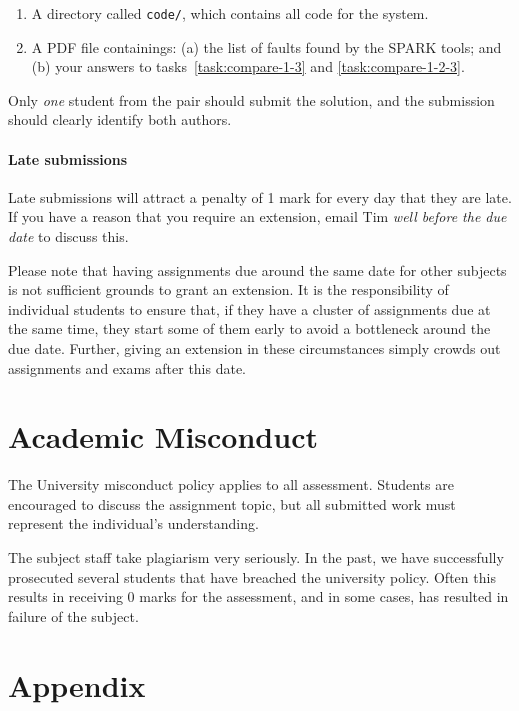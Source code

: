 \documentclass[a4paper,11pt]{article}
\begin{document}
\begin{enumerate}[topsep=0mm,itemsep=1mm]

 \item A directory called \texttt{code/}, which contains all code for the system.

 \item A PDF file containings: (a) the list of faults found by the SPARK tools; and (b) your answers to tasks~\ref{task:compare-1-3} and \ref{task:compare-1-2-3}.

\end{enumerate}

Only \emph{one} student from the pair should submit the solution, and the submission should clearly identify both authors.

\paragraph{Late submissions} Late submissions will attract a penalty of 1 mark for every day that they are late. If you have a reason that you require an extension, email Tim {\em well before the due date} to discuss this. 

Please note that having assignments due around the same date for other subjects is not sufficient grounds to grant an extension. It is the responsibility of individual students to ensure that, if they have a cluster of assignments due at the same time, they start some of them early to avoid a bottleneck around the due date. Further, giving an extension in these circumstances simply crowds out assignments and exams after this date. 

\section{Academic Misconduct}

The University misconduct policy applies to all assessment. Students are encouraged to discuss the assignment topic, but all submitted work must represent the individual's understanding. 

The subject staff take plagiarism very seriously. In the past, we have successfully prosecuted several students that have breached the university policy. Often this results in receiving 0 marks for the assessment, and in some cases, has resulted in failure of the subject.

\section*{Appendix}

\appendix


\end{document}
